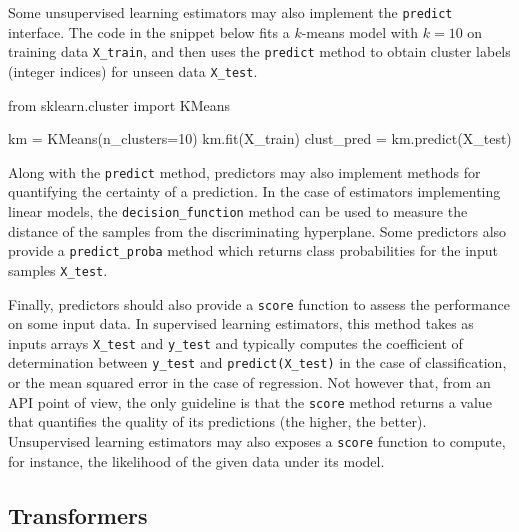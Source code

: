 \documentclass{llncs}
\begin{document}
Some unsupervised learning estimators may also implement the \texttt{predict}
interface. The code in the snippet below fits a $k$-means model with $k=10$ on
training data \texttt{X\_train}, and then uses the  \texttt{predict} method to
obtain cluster labels (integer indices) for unseen data \texttt{X\_test}.
\begin{pythoncode}
from sklearn.cluster import KMeans

km = KMeans(n_clusters=10)
km.fit(X_train)
clust_pred = km.predict(X_test)
\end{pythoncode}

Along with the \texttt{predict} method, predictors may also implement methods
for quantifying the certainty of a prediction. In the case of estimators
implementing linear models, the \texttt{decision\_function} method can be used
to measure the distance of the samples from the discriminating hyperplane. Some
predictors also provide a \texttt{predict\_proba} method which returns
class probabilities for the input samples \texttt{X\_test}.

Finally, predictors should also provide a \texttt{score} function to assess the
performance on some input data. In supervised learning estimators, this method
takes as inputs arrays \texttt{X\_test} and \texttt{y\_test} and typically
computes the coefficient of determination between \texttt{y\_test} and
\texttt{predict(X\_test)} in the case of classification, or the mean squared
error in the case of regression. Not however that, from an API point of view,
the only guideline is that the \texttt{score} method returns a value
that quantifies the quality of its predictions (the higher, the better).
Unsupervised learning estimators may also exposes a \texttt{score} function
to compute, for instance, the likelihood of the given data under its model.

\subsection{Transformers}
\end{document}
